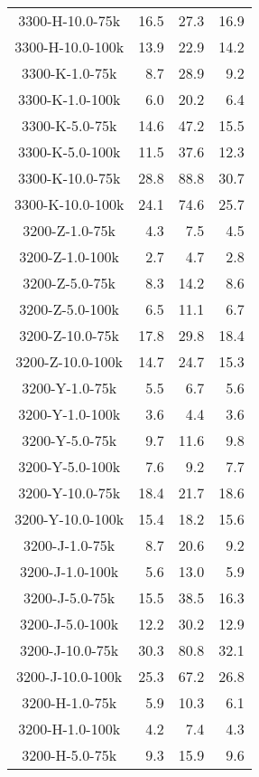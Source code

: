 \begin{longtable}{crrr}
    3300-H-10.0-75k  &   16.5 &   27.3 &   16.9 \\
    3300-H-10.0-100k &   13.9 &   22.9 &   14.2 \\
    3300-K-1.0-75k   &    8.7 &   28.9 &    9.2 \\
    3300-K-1.0-100k  &    6.0 &   20.2 &    6.4 \\
    3300-K-5.0-75k   &   14.6 &   47.2 &   15.5 \\
    3300-K-5.0-100k  &   11.5 &   37.6 &   12.3 \\
    3300-K-10.0-75k  &   28.8 &   88.8 &   30.7 \\
    3300-K-10.0-100k &   24.1 &   74.6 &   25.7 \\
    3200-Z-1.0-75k   &    4.3 &    7.5 &    4.5 \\
    3200-Z-1.0-100k  &    2.7 &    4.7 &    2.8 \\
    3200-Z-5.0-75k   &    8.3 &   14.2 &    8.6 \\
    3200-Z-5.0-100k  &    6.5 &   11.1 &    6.7 \\
    3200-Z-10.0-75k  &   17.8 &   29.8 &   18.4 \\
    3200-Z-10.0-100k &   14.7 &   24.7 &   15.3 \\
    3200-Y-1.0-75k   &    5.5 &    6.7 &    5.6 \\
    3200-Y-1.0-100k  &    3.6 &    4.4 &    3.6 \\
    3200-Y-5.0-75k   &    9.7 &   11.6 &    9.8 \\
    3200-Y-5.0-100k  &    7.6 &    9.2 &    7.7 \\
    3200-Y-10.0-75k  &   18.4 &   21.7 &   18.6 \\
    3200-Y-10.0-100k &   15.4 &   18.2 &   15.6 \\
    3200-J-1.0-75k   &    8.7 &   20.6 &    9.2 \\
    3200-J-1.0-100k  &    5.6 &   13.0 &    5.9 \\
    3200-J-5.0-75k   &   15.5 &   38.5 &   16.3 \\
    3200-J-5.0-100k  &   12.2 &   30.2 &   12.9 \\
    3200-J-10.0-75k  &   30.3 &   80.8 &   32.1 \\
    3200-J-10.0-100k &   25.3 &   67.2 &   26.8 \\
    3200-H-1.0-75k   &    5.9 &   10.3 &    6.1 \\
    3200-H-1.0-100k  &    4.2 &    7.4 &    4.3 \\
    3200-H-5.0-75k   &    9.3 &   15.9 &    9.6 \\

\end{longtable}
